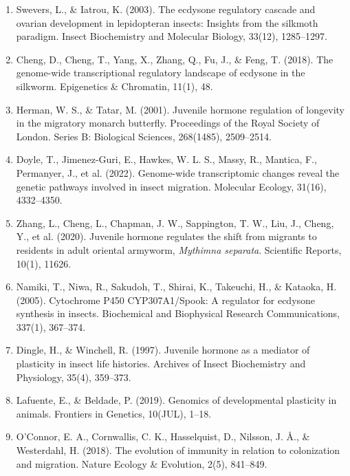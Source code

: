 \documentclass[lineno]{wiley-article}
\begin{document}
\begin{enumerate}
\item Swevers, L., \& Iatrou, K. (2003). The ecdysone regulatory cascade and ovarian development in lepidopteran insects: Insights from the silkmoth paradigm. Insect Biochemistry and Molecular Biology, 33(12), 1285–1297.

\item Cheng, D., Cheng, T., Yang, X., Zhang, Q., Fu, J., \& Feng, T. (2018). The genome-wide transcriptional regulatory landscape of ecdysone in the silkworm. Epigenetics \& Chromatin, 11(1), 48.

\item Herman, W. S., \& Tatar, M. (2001). Juvenile hormone regulation of longevity in the migratory monarch butterfly. Proceedings of the Royal Society of London. Series B: Biological Sciences, 268(1485), 2509–2514.

\item Doyle, T., Jimenez-Guri, E., Hawkes, W. L. S., Massy, R., Mantica, F., Permanyer, J., et al. (2022). Genome-wide transcriptomic changes reveal the genetic pathways involved in insect migration. Molecular Ecology, 31(16), 4332–4350.

\item Zhang, L., Cheng, L., Chapman, J. W., Sappington, T. W., Liu, J., Cheng, Y., et al. (2020). Juvenile hormone regulates the shift from migrants to residents in adult oriental armyworm, \textit{Mythimna separata}. Scientific Reports, 10(1), 11626.

\item Namiki, T., Niwa, R., Sakudoh, T., Shirai, K., Takeuchi, H., \& Kataoka, H. (2005). Cytochrome P450 CYP307A1/Spook: A regulator for ecdysone synthesis in insects. Biochemical and Biophysical Research Communications, 337(1), 367–374.

\item Dingle, H., \& Winchell, R. (1997). Juvenile hormone as a mediator of plasticity in insect life histories. Archives of Insect Biochemistry and Physiology, 35(4), 359–373.

\item Lafuente, E., \& Beldade, P. (2019). Genomics of developmental plasticity in animals. Frontiers in Genetics, 10(JUL), 1–18.

\item O’Connor, E. A., Cornwallis, C. K., Hasselquist, D., Nilsson, J. Å., \& Westerdahl, H. (2018). The evolution of immunity in relation to colonization and migration. Nature Ecology \& Evolution, 2(5), 841–849.


\end{enumerate}
\end{document}
